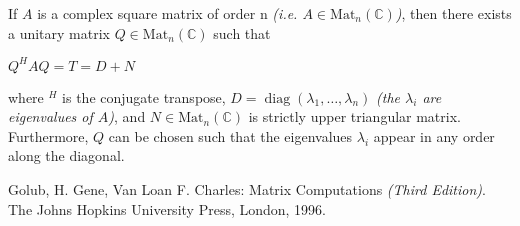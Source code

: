 \documentclass[12pt]{article}
\begin{document}
If $A$ is a complex square matrix of order n \textit{(i.e. $A\in\mathrm{Mat}_n(\mathbb{C})$)}, then there exists a unitary matrix $Q \in \mathrm{Mat}_n(\mathbb{C})$ such that\\
\begin{center}
$Q^HAQ = T = D + N$
\end{center}
where $^H$ is the conjugate transpose, $D = \operatorname{diag}(\lambda_1,   \dots, \lambda_n)$ \textit{(the $\lambda_i$ are eigenvalues of $A$)}, and $N \in \mathrm{Mat}_n(\mathbb{C})$ is strictly upper triangular matrix.  Furthermore, $Q$ can be chosen such that the eigenvalues $\lambda_i$ appear in any order along the diagonal.  \cite{1}
\begin{thebibliography}{1}
 Golub, H. Gene, Van Loan F. Charles:  Matrix Computations \textit{(Third Edition)}.  The Johns Hopkins University Press, London, 1996.
\end{thebibliography}
\end{document}
